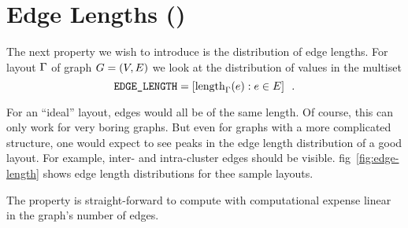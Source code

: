 \documentclass{graphstudy}
\begin{document}
\begin{Figure}
  \caption[ examples]{%
    Distributions for the  property shown for the three example layouts.  The regular grid again features
    very sharp peaks.  The dominating peak at \(\pi/2\) is the angle between the incident edges of nodes with degree
    \(4\).  A smaller peak at \(\pi\) corresponds to the angles between the edges along the margin of the grid.  The
    barely visible signal at \(\pi3/2\) is caused by the four corner vertices.  The distorted grid shows again a similar
    distribution but with wider and additional peaks.  The layout for the graph on the right has a maximum near \(0\)
    due to the many vertices with a high degree.  Nevertheless, there are two additional pronounced peaks around \(\pi\)
    and \(2\pi\) courtesy of the vertices with degree \(2\) and \(1\) respectively.
  }
  \label{fig:angular}
\end{Figure}

\section{Edge Lengths ()}
\label{sec:edge-length}

The next property we wish to introduce is the distribution of edge lengths.  For layout \(\Gamma\) of graph
\(G=(V,E)\) we look at the distribution of values in the multiset
\begin{equation}
  \mbox{\text{\upshape\ttfamily EDGE\_LENGTH}}=\left[\operatorname{length}_\Gamma(e):{e}\in E\right]\enspace.
\end{equation}

For an \enquote{ideal} layout, edges would all be of the same length.  Of course, this can only work for very boring
graphs.  But even for graphs with a more complicated structure, one would expect to see peaks in the edge length
distribution of a good layout.  For example, inter- and intra-cluster edges should be visible.
\Acl{fig}~\ref{fig:edge-length} shows edge length distributions for thee sample layouts.

The  property is straight-forward to compute with computational expense linear in the graph's number
of edges.

\begin{Figure}
  \caption[ examples]{%
    Distribution of the  property for three layouts.  The distribution for the regular grid on the
    left shows only a single sharp peak which would again be a Dirac delta function if it were not for the finite filter
    width.  The distorted gird in the middle has a broad signal with a few unidentifiable buckles forming an overall
    Gaussian shape.  The force-directed layout on the right exposes a clear peak at the target edge length with two
    roughly symmetric shoulders and low but non-zero signal towards either end of the spectrum.
  }
  \label{fig:edge-length}
\end{Figure}
\end{document}
